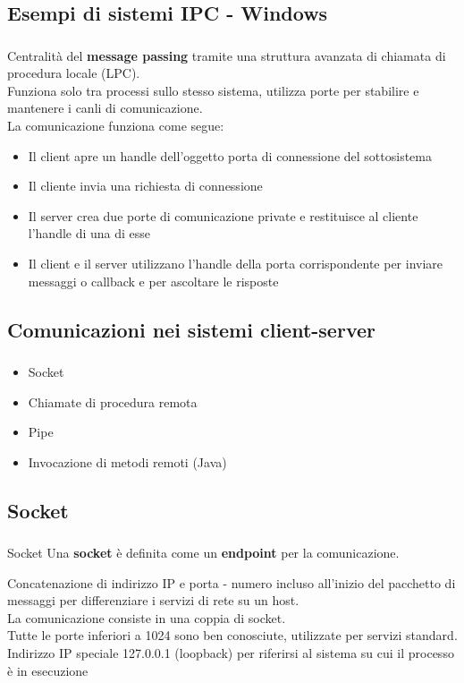 \documentclass{beamer}
\newenvironment{mainframe}{
	\begin{frame}
		\frametitle{\insertsubsection}
		\framesubtitle{\insertsection}
	}{
	\end{frame}
}
\begin{document}
\subsection{Esempi di sistemi IPC - Windows}
\begin{mainframe}
	Centralità del \textbf{message passing} tramite una struttura avanzata di chiamata di procedura locale (LPC).\\
	Funziona solo tra processi sullo stesso sistema, utilizza porte per stabilire e mantenere i canli di comunicazione.\\
	La comunicazione funziona come segue:
	\begin{itemize}
		\item Il client apre un handle dell'oggetto porta di connessione del sottosistema
		\item Il cliente invia una richiesta di connessione
		\item Il server crea due porte di comunicazione private e restituisce al cliente l'handle di una di esse
		\item Il client e il server utilizzano l'handle della porta corrispondente per inviare messaggi o callback e per ascoltare le risposte
	\end{itemize}
\end{mainframe}
\subsection{Comunicazioni nei sistemi client-server}
\begin{mainframe}
	\begin{itemize}
		\item Socket
		\item Chiamate di procedura remota
		\item Pipe
		\item Invocazione di metodi remoti (Java)
	\end{itemize}
\end{mainframe}
\subsection{Socket}
\begin{mainframe}
	\begin{block}{Socket}
		Una \textbf{socket} è definita come un \textbf{endpoint} per la comunicazione.
	\end{block}
	Concatenazione di indirizzo IP e porta - numero incluso all'inizio del pacchetto di messaggi per differenziare i servizi di rete su un host.\\
	La comunicazione consiste in una coppia di socket.\\
	Tutte le porte inferiori a 1024 sono ben conosciute, utilizzate per servizi standard.\\
	Indirizzo IP speciale 127.0.0.1 (loopback) per riferirsi al sistema su cui il processo è in esecuzione
\end{mainframe}
\end{document}
